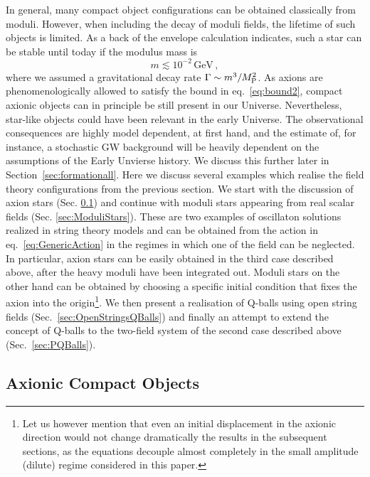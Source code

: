 \documentclass[11pt,a4paper]{article}
\newcommand{\be}{\begin{equation}}
\newcommand{\ee}{\end{equation}}
\begin{document}
In general, many compact object configurations can be obtained classically from moduli. However, when including the decay of moduli fields, the lifetime of such objects is limited. As a back of the envelope calculation indicates, such a star can be stable until today if the modulus mass is
\be
m \lesssim 10^{-2} \, \text{GeV} \,,
\label{eq:bound2}
\ee
where we assumed a gravitational decay rate $\Gamma\sim m^3/M_{\rm P}^2$. As axions are phenomenologically allowed to satisfy the bound in eq.~\eqref{eq:bound2}, compact axionic objects can in principle be still present in our Universe. Nevertheless, star-like objects could have been relevant in the early Universe. The observational consequences are highly model dependent, at first hand, and the estimate of, for instance, a stochastic GW background will be heavily dependent on the assumptions of the Early Unvierse history. We discuss this further later in Section~\ref{sec:formationall}. Here we discuss several examples which realise the field theory configurations from the previous section. We start with the discussion of axion stars (Sec. \ref{sec:StringyAxionStars}) and continue with moduli stars appearing from real scalar fields (Sec. \ref{sec:ModuliStars}). These are two examples of oscillaton solutions realized in string theory models and can be obtained from the action in eq.~\eqref{eq:GenericAction} in the regimes in which one of the field can be neglected. In particular, axion stars can be easily obtained in the third case described above, after the heavy moduli have been integrated out. Moduli stars on the other hand can be obtained by choosing a specific initial condition that fixes the axion into the origin\footnote{Let us however mention that even an initial displacement in the axionic direction would not change dramatically the results in the subsequent sections, as the equations decouple almost completely in the small amplitude (dilute) regime considered in this paper.}. We then present a realisation of Q-balls using open string fields (Sec.~\ref{sec:OpenStringsQBalls}) and finally an attempt to extend the concept of Q-balls to the two-field system of the second case described above (Sec.~\ref{sec:PQBalls}).

\subsection{Axionic Compact Objects}
\label{sec:StringyAxionStars}
\end{document}
